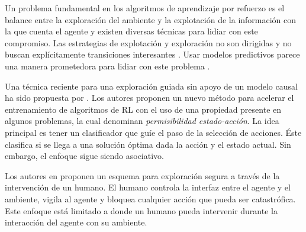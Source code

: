 Un problema fundamental en los algoritmos de aprendizaje por refuerzo
es el balance entre la exploración del ambiente y la explotación
de la información con la que cuenta el agente y existen diversas técnicas para lidiar con este compromiso.
Las estrategias de explotación y exploración no 
son dirigidas y no buscan explícitamente transiciones
interesantes \cite{mcfarlane2018survey}.
Usar modelos predictivos parece una manera 
prometedora para lidiar con este problema \cite{hafner2019dream}.
 
Una técnica reciente para una exploración 
guiada sin apoyo de un modelo causal ha sido
propuesta por \cite{mazumder2019guided}.
Los autores proponen un nuevo método
para acelerar el entrenamiento de algoritmos de RL con el uso de una propiedad presente
en algunos problemas, la cual denominan \textit{permisibilidad estado-acción}.
La idea principal es tener un clasificador
que guíe el paso de la selección de acciones. Éste clasifica si se llega
a una solución óptima dada la acción y el
estado actual. Sin embargo, el enfoque sigue siendo
asociativo.

Los autores en \cite{saunders2017trial} proponen un esquema 
para exploración segura a través de la intervención de un humano. El humano controla la interfaz entre el agente y el ambiente, vigila
al agente y bloquea cualquier acción que pueda ser catastrófica. Este enfoque
está limitado a donde un humano pueda intervenir durante la interacción 
del agente con su ambiente.



